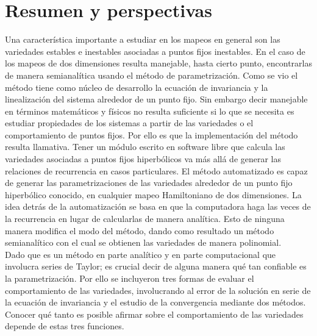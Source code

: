 
\chapter{Resumen y perspectivas}
Una característica importante a estudiar en los mapeos en general son las variedades estables e inestables asociadas a puntos fijos inestables. En el caso de los mapeos de dos dimensiones resulta manejable, hasta cierto punto, encontrarlas de manera semianalítica usando el método de parametrización. Como se vio el método tiene como núcleo de desarrollo la ecuación de invariancia y la linealización del sistema alrededor de un punto fijo. Sin embargo decir manejable en términos matemáticos y físicos no resulta suficiente si lo que se necesita es estudiar propiedades de los sistemas a partir de las variedades o el comportamiento de puntos fijos. Por ello es que la implementación del método resulta llamativa. Tener un módulo escrito en software libre que calcula las variedades asociadas a puntos fijos hiperbólicos va más allá de generar las relaciones de recurrencia en casos particulares. El método automatizado es capaz de generar las parametrizaciones de las variedades alrededor de un punto fijo hiperbólico conocido, en cualquier mapeo Hamiltoniano de dos dimensiones. La idea detrás de la automatización se basa en que la computadora haga las veces de la recurrencia en lugar de calcularlas de manera analítica. Esto de ninguna manera modifica el modo del método, dando como resultado un método semianalítico con el cual se obtienen las variedades de manera polinomial. \\

Dado que es un método en parte analítico y en parte computacional que involucra series de Taylor; es crucial decir de alguna manera qué tan confiable es la parametrización. Por ello se incluyeron tres formas de evaluar el comportamiento de las variedades, involucrando al error de la solución en serie de la ecuación de invariancia y el estudio de la convergencia mediante dos métodos. Conocer qué tanto es posible afirmar sobre el comportamiento de las variedades depende de estas tres funciones.\\


